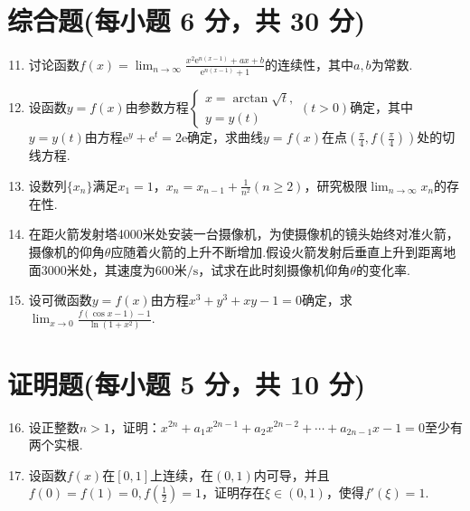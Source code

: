 \documentclass[../main.tex]{subfiles}
\begin{document}
\section{综合题(每小题 6 分，共 30 分)}
\begin{enumerate}
    \setcounter{enumi}{10}
    \item 讨论函数$f(x)=\lim_{n\to\infty}\frac{x^{2}\mathrm{e}^{n(x-1)}+ax+b}{\mathrm{e}^{n(x-1)}+1}$的连续性，其中$a
              ,b$为常数.
          \vspace{13em}

    \item 设函数$y=f(x)$由参数方程$\begin{cases}
                  x=\arctan\sqrt{t}, \\
                  y=y(t)
              \end{cases}(t>0)$确定，其中$y=y(t)$由方程$\mathrm{e}^{y}+\mathrm{e}^{t}=2\mathrm{e}$确定，求曲线$y
              =f(x)$在点$\left(\frac{\pi}{4},f\left(\frac{\pi}{4}\right)\right)$处的切线方程.
          \vspace{13em}

    \item 设数列$\{x_{n}\}$满足$x_{1}=1$，$x_{n}=x_{n-1}+\frac{1}{n^{2}}(n\geq
              2)$，研究极限$\lim_{n\to\infty}x_{n}$的存在性.
          \vspace{8em}

    \item 在距火箭发射塔4000米处安装一台摄像机，为使摄像机的镜头始终对准火箭，摄像机的仰角$\theta$应随着火箭的上升不断增加.假设火箭发射后垂直上升到距离地面3000米处，其速度为$6
              00$米$/\mathrm{s}$，试求在此时刻摄像机仰角$\theta$的变化率.
          \vspace{8em}

    \item 设可微函数$y=f(x)$由方程$x^{3}+y^{3}+xy-1=0$确定，求$\lim_{x\to0}\frac{f(\cos
                  x-1)-1}{\ln(1+x^{2})}$.
          \vspace{8em}
\end{enumerate}

\section{证明题(每小题 5 分，共 10 分)}
\begin{enumerate}
    \setcounter{enumi}{15}
    \item 设正整数$n>1$，证明：$x^{2n}+a_{1}x^{2n-1}+a_{2}x^{2n-2}+\cdots+a_{2n-1}
              x-1=0$至少有两个实根.
          \vspace{10em}

    \item 设函数$f(x)$在$[0,1]$上连续，在$(0,1)$内可导，并且$f(0)=f(1)=0,f\left
              (\frac{1}{2}\right)=1$，证明存在$\xi\in(0,1)$，使得$f'(\xi)=1$.
          \vspace{8em}
\end{enumerate}
\end{document}
